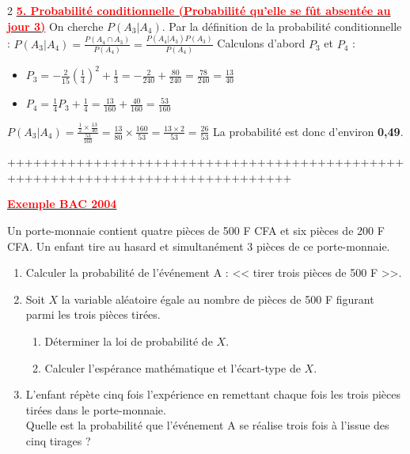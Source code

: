\documentclass[12pt,a4paper]{article}
\begin{document}
\begin{multicols}{2}
\underline{\textbf{\textcolor{red}{5. Probabilité conditionnelle (Probabilité qu'elle se fût absentée au jour 3)}}}
On cherche $P(A_3 | A_4)$. Par la définition de la probabilité conditionnelle :
$ P(A_3 | A_4) = \frac{P(A_4 \cap A_3)}{P(A_4)} = \frac{P(A_4 | A_3) P(A_3)}{P(A_4)} $
Calculons d'abord $P_3$ et $P_4$ :
\begin{itemize}
    \item $P_3 = -\frac{2}{15} (\frac{1}{4})^2 + \frac{1}{3} = -\frac{2}{240} + \frac{80}{240} = \frac{78}{240} = \frac{13}{40}$
    \item $P_4 = \frac{1}{4} P_3 + \frac{1}{4} = \frac{13}{160} + \frac{40}{160} = \frac{53}{160}$
\end{itemize}
$ P(A_3 | A_4) = \frac{\frac{1}{2} \times \frac{13}{40}}{\frac{53}{160}} = \frac{13}{80} \times \frac{160}{53} = \frac{13 \times 2}{53} = \frac{26}{53} $
La probabilité est donc d'environ \textbf{0,49}.

\end{multicols}

+++++++++++++++++++++++++++++++++++++++++++++++++++++++++++++++++++++++++++++++

\underline{\textbf{\textcolor{red}{Exemple BAC 2004}}}


Un porte-monnaie contient quatre pièces de 500 F CFA et six pièces de 200 F CFA. Un enfant tire au hasard et simultanément 3 pièces de ce porte-monnaie.

\begin{enumerate}
    \item Calculer la probabilité de l'événement A : << tirer trois pièces de 500 F >>.
    
    \item Soit $X$ la variable aléatoire égale au nombre de pièces de 500 F figurant parmi les trois pièces tirées.
    \begin{enumerate}
        \item Déterminer la loi de probabilité de $X$.
        \item Calculer l'espérance mathématique et l'écart-type de $X$.
    \end{enumerate}
    
    \item L'enfant répète cinq fois l'expérience en remettant chaque fois les trois pièces tirées dans le porte-monnaie. \\
    Quelle est la probabilité que l'événement A se réalise trois fois à l'issue des cinq tirages ?
\end{enumerate}
\end{document}
